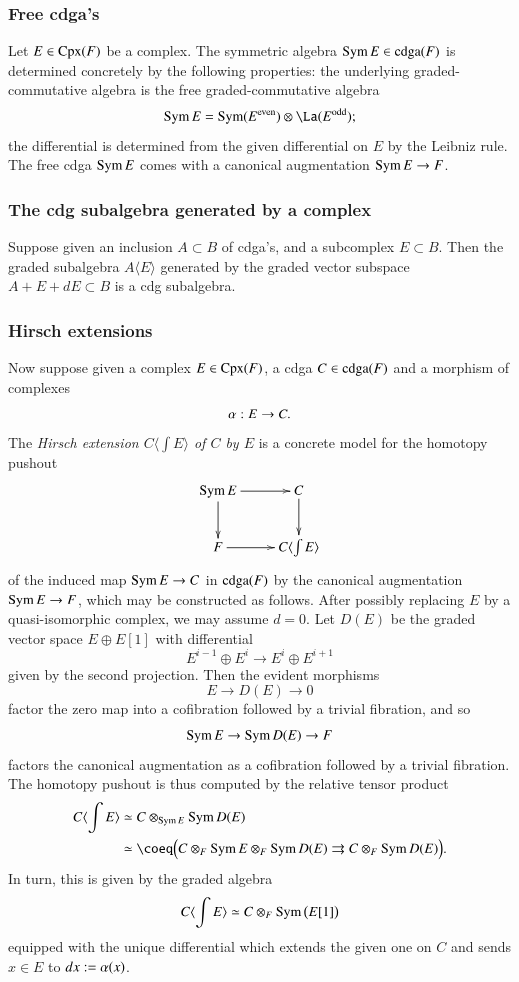 \subsubsection{Free cdga's}
\label{LA23}
Let $E \in \operatorname{Cpx}(F)$ be a complex. The symmetric algebra $\operatorname{Sym} E \in \operatorname{cdga}(F)$ is determined concretely by the following properties: the underlying graded-commutative algebra is the free graded-commutative algebra
\[
\Sym E = \Sym(E^\m{even}) \otimes 
\La(E^\m{odd});
\]
the differential is determined from the given differential on $E$ by the Leibniz rule. The free cdga $\operatorname{Sym} E$ comes with a canonical augmentation $\operatorname{Sym} E \to F$. 

\subsubsection{The cdg subalgebra generated by a complex}
\label{LX66}
Suppose given an inclusion $A \subset B$ of cdga's, and a subcomplex $E \subset B$. Then the graded subalgebra $A\langle E \rangle$ generated by the graded vector subspace $A + E + dE \subset B$ is a cdg subalgebra. 

\subsubsection{Hirsch extensions}
\label{LA24}
Now suppose given a complex $E \in \operatorname{Cpx}(F)$, a cdga $C \in \operatorname{cdga}(F)$ and a morphism of complexes 
\[
\alpha: E \to C. 
\]
The \emph{Hirsch extension $C \langle \int E \rangle$ of $C$ by $E$} is a concrete model for the homotopy pushout
\[
\xymatrix{
\Sym E \ar[r] \ar[d] & C \ar[d] 
\\
F \ar[r] & C \langle \int E \rangle
}
\]
of the induced map $\operatorname{Sym} E \to C$ in $\operatorname{cdga}(F)$ by the canonical augmentation $\operatorname{Sym} E \to F$, which may be constructed as follows. After possibly replacing $E$ by a quasi-isomorphic complex, we may assume $d=0$. Let $D(E)$ be the graded vector space $E \oplus E[1]$ with differential 
\[
E^{i-1} \oplus E^{i} \to E^{i} \oplus E^{i+1}
\]
given by the second projection. Then the evident morphisms
\[
E \to D(E) \to 0
\]
factor the zero map into a cofibration followed by a trivial fibration, and so 
\[
\operatorname{Sym} E \to \operatorname{Sym} D(E) \to F
\]
factors the canonical augmentation as a cofibration followed by a trivial fibration. The homotopy pushout is thus computed by the relative tensor product 
\begin{align*}
C \langle \int E \rangle 
& \simeq C \otimes_{\Sym E} \Sym D(E)
\\
& \simeq
\coeq \Big(C \otimes_F \Sym E \otimes_F \Sym D(E)
\rightrightarrows
C \otimes_F \Sym D(E) \Big)
.
\end{align*}
In turn, this is given by the graded algebra
\[
C \langle \int E \rangle 
\simeq
C \otimes_F \operatorname{Sym} \big( E[1] \big)
\]
equipped with the unique differential which extends the given one on $C$ and sends $x \in E$ to $dx := \alpha(x)$. 

